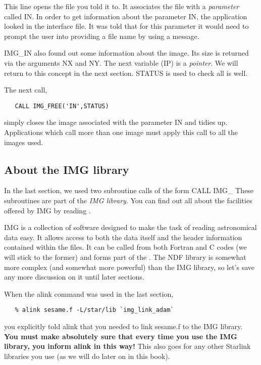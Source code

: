 This line opens the file you told it to. It associates the file with a
{\it parameter} called {\sf IN}. In order to get information about the
parameter {\sf IN}, the application looked in the interface file. It was
told that for this parameter it would need to prompt the user into
providing a file name by using a message.

{\sf IMG\_IN} also found out some information about the image. Its size
is returned via the arguments {\sf NX} and {\sf NY}.  The next variable
({\sf IP}) is a {\it pointer}. We will return to this concept in the next
section.  {\sf STATUS} is used to check all is well.

The next call,

\begin{verbatim}
   CALL IMG_FREE('IN',STATUS)
\end{verbatim}

simply closes the image associated with the parameter {\sf IN} and tidies
up. Applications which call more than one image must apply this call to
all the images used.

\subsection{About the IMG library}

In the last section, we used two subroutine calls of the form {\sf CALL
IMG\_} These subroutines are part of the {\it IMG library}. You can find
out all about the facilities offered by IMG by reading
.

IMG is a collection of software designed to make the task of reading
astronomical data easy. It allows access to both the data itself and the
header information contained within the files. It can be called from both
Fortran and C codes (we will stick to the former) and forms part
of the . The NDF library is somewhat more
complex (and somewhat more powerful) than the IMG library, so let's save
any more discussion on it until later sections.

When the {\sf alink} command was used in the last section,

\begin{verbatim}
   % alink sesame.f -L/star/lib `img_link_adam`
\end{verbatim}

you explicitly told alink that you needed to link {\sf sesame.f} to
the IMG library. {\bf You must make absolutely sure that every
time you use the IMG library, you inform alink in this way!} This
also goes for any other Starlink libraries you use (as we will do later
on in this book).

